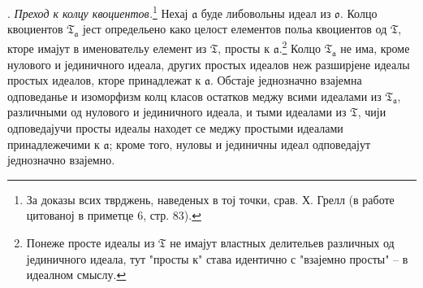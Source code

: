 \documentclass[11pt]{article}
\newcommand{\mo}{\mathfrak{o}}
\newcommand{\mT}{\mathfrak{T}}
\newcommand{\ma}{\mathfrak{a}}
\begin{document}
\setcounter{footnote}{35}

. \emph{Преход к колцу квоциентов.}\footnote{За доказы всих тврджень, наведеных в тој точки, срав. Х. Грелл (в работе цитованој в приметце 6, стр. 83).} Нехај $\ma$ буде либовольны идеал из $\mo$. Колцо квоциентов $\mT_\ma$ јест определьено како целост елементов польа квоциентов од $\mT$, кторе имајут в именовательу елемент из $\mT$, просты к $\ma$.\footnote{Понеже просте идеалы из $\mT$ не имајут властных делительев различных од јединичного идеала, тут "просты к" става идентично с "взајемно просты" -- в идеалном смыслу.} Колцо $\mT_\ma$ не има, кроме нулового и јединичного идеала, других простых идеалов неж разширјене идеалы простых идеалов, кторе принадлежат к $\ma$. Обстаје једнозначно взајемна одповеданье и изоморфизм колц класов остатков меджу всими идеалами из $\mT_\ma$, различными од нулового и јединичного идеала, и тыми идеалами из $\mT$, чији одповедајучи просты идеалы находет се меджу простыми идеалами принадлежечими к $\ma$; кроме того, нуловы и јединичны идеал одповедајут једнозначно взајемно.
\end{document}

